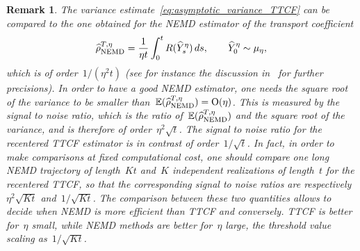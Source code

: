 \documentclass[11pt]{article}
\newcommand{\E}{\mathbb{E}}
\newtheorem{remark}[theorem]{Remark}
\theoremstyle{definition}
\newcommand{\TestNEMD}{\estTmp^{T,\eta}_{\rm NEMD}}
\newcommand{\estTmp}{\widehat{\rho}}
\begin{document}
\begin{remark}
  \label{rmk:NEMD_vs_TTCF}
  The variance estimate~\eqref{eq:asymptotic_variance_TTCF} can be compared to the one obtained for the NEMD estimator of the transport coefficient
  \[
  \TestNEMD = \frac{1}{\eta t} \int_0^t R(\widehat{Y}_s^\eta) \, ds, \qquad \widehat{Y}_0^\eta \sim \mu_\eta,
  \]
  which is of order~$1/(\eta^2 t)$ (see for instance the discussion in~\cite[Section~3.1]{stoltz2024} for further precisions). In order to have a good NEMD estimator, one needs the square root of the variance to be smaller than~$\E(\TestNEMD) = \mathrm{O}(\eta)$. This is measured by the signal to noise ratio, which is the ratio of~$\E(\TestNEMD)$ and the square root of the variance, and is therefore of order~$\eta^2 \sqrt{t}$. The signal to noise ratio for the recentered TTCF estimator is in contrast of order~$1/\sqrt{t}$. In fact, in order to make comparisons at fixed computational cost, one should compare one long NEMD trajectory of length~$Kt$ and~$K$ independent realizations of length~$t$ for the recentered TTCF, so that the corresponding signal to noise ratios are respectively~$\eta^2 \sqrt{Kt}$ and~$1/\sqrt{Kt}$. The comparison between these two quantities allows to decide when NEMD is more efficient than TTCF and conversely. TTCF is better for~$\eta$ small, while NEMD methods are better for~$\eta$ large, the threshold value scaling as~$1/\sqrt{Kt}$.
\end{remark}


\end{document}
